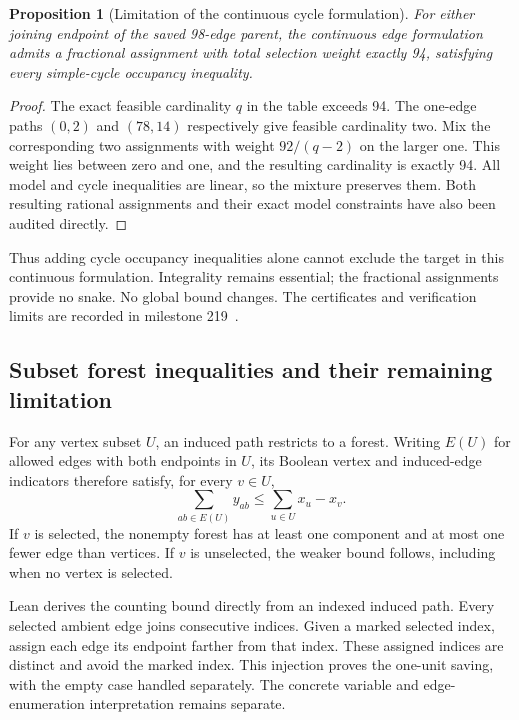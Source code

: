 \documentclass[11pt,a4paper]{article}
\newtheorem{proposition}[theorem]{Proposition}
\theoremstyle{definition}
\theoremstyle{remark}
\begin{document}
\begin{proposition}[Limitation of the continuous cycle formulation]
\label{prop:cycle-relaxation219}
For either joining endpoint of the saved 98-edge parent, the continuous
edge formulation admits a fractional assignment with total selection
weight exactly 94, satisfying every simple-cycle occupancy inequality.
\end{proposition}
\begin{proof}
The exact feasible cardinality $q$ in the table exceeds 94. The one-edge
paths $(0,2)$ and $(78,14)$ respectively give feasible cardinality two.
Mix the corresponding two assignments with weight $92/(q-2)$ on the
larger one. This weight lies between zero and one, and the resulting
cardinality is exactly 94. All model and cycle inequalities are linear,
so the mixture preserves them. Both resulting rational assignments
and their exact model constraints have also been audited directly.
\end{proof}
Thus adding cycle occupancy inequalities alone cannot exclude the target
in this continuous formulation. Integrality remains essential; the
fractional assignments provide no snake. No global bound changes.
The certificates and verification limits are recorded in milestone
219~\cite{research219}.

\subsection{Subset forest inequalities and their remaining limitation}
\label{sec:forest220}
For any vertex subset $U$, an induced path restricts to a forest.
Writing $E(U)$ for allowed edges with both endpoints in $U$, its Boolean
vertex and induced-edge indicators therefore satisfy, for every $v\in U$,
\begin{equation}\label{eq:forest220}
\sum_{ab\in E(U)}y_{ab}\le\sum_{u\in U}x_u-x_v.
\end{equation}
If $v$ is selected, the nonempty forest has at least one component and
at most one fewer edge than vertices. If $v$ is unselected, the weaker
bound follows, including when no vertex is selected.

Lean derives the counting bound directly from an indexed induced path.
Every selected ambient edge joins consecutive indices. Given a marked
selected index, assign each edge its endpoint farther from that index.
These assigned indices are distinct and avoid the marked index. This
injection proves the one-unit saving, with the empty case handled separately.
The concrete variable and edge-enumeration interpretation remains separate.
\end{document}

